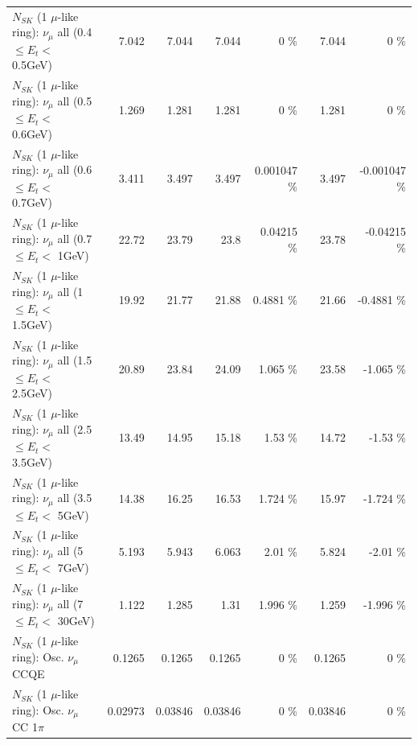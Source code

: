 \begin{table}
\begin{tabular}{| l | r | r | r  r | r  r |}
       $N_{SK}$ (1 $\mu$-like ring): $\nu_{\mu}$ all (0.4 $\leq E_{t} <$ 0.5GeV) &           7.042 &           7.044 &           7.044 &        0 \%  &           7.044 &        0 \%  \\ 
       $N_{SK}$ (1 $\mu$-like ring): $\nu_{\mu}$ all (0.5 $\leq E_{t} <$ 0.6GeV) &           1.269 &           1.281 &           1.281 &        0 \%  &           1.281 &        0 \%  \\ 
       $N_{SK}$ (1 $\mu$-like ring): $\nu_{\mu}$ all (0.6 $\leq E_{t} <$ 0.7GeV) &           3.411 &           3.497 &           3.497 & 0.001047 \%  &           3.497 & -0.001047 \%  \\ 
         $N_{SK}$ (1 $\mu$-like ring): $\nu_{\mu}$ all (0.7 $\leq E_{t} <$ 1GeV) &           22.72 &           23.79 &            23.8 &  0.04215 \%  &           23.78 & -0.04215 \%  \\ 
         $N_{SK}$ (1 $\mu$-like ring): $\nu_{\mu}$ all (1 $\leq E_{t} <$ 1.5GeV) &           19.92 &           21.77 &           21.88 &   0.4881 \%  &           21.66 &  -0.4881 \%  \\ 
       $N_{SK}$ (1 $\mu$-like ring): $\nu_{\mu}$ all (1.5 $\leq E_{t} <$ 2.5GeV) &           20.89 &           23.84 &           24.09 &    1.065 \%  &           23.58 &   -1.065 \%  \\ 
       $N_{SK}$ (1 $\mu$-like ring): $\nu_{\mu}$ all (2.5 $\leq E_{t} <$ 3.5GeV) &           13.49 &           14.95 &           15.18 &     1.53 \%  &           14.72 &    -1.53 \%  \\ 
         $N_{SK}$ (1 $\mu$-like ring): $\nu_{\mu}$ all (3.5 $\leq E_{t} <$ 5GeV) &           14.38 &           16.25 &           16.53 &    1.724 \%  &           15.97 &   -1.724 \%  \\ 
           $N_{SK}$ (1 $\mu$-like ring): $\nu_{\mu}$ all (5 $\leq E_{t} <$ 7GeV) &           5.193 &           5.943 &           6.063 &     2.01 \%  &           5.824 &    -2.01 \%  \\ 
          $N_{SK}$ (1 $\mu$-like ring): $\nu_{\mu}$ all (7 $\leq E_{t} <$ 30GeV) &           1.122 &           1.285 &            1.31 &    1.996 \%  &           1.259 &   -1.996 \%  \\ 
\hline
\hline
                               $N_{SK}$ (1 $\mu$-like ring): Osc. $\nu_\mu$ CCQE &          0.1265 &          0.1265 &          0.1265 &        0 \%  &          0.1265 &        0 \%  \\ 
                          $N_{SK}$ (1 $\mu$-like ring): Osc. $\nu_\mu$ CC 1$\pi$ &         0.02973 &         0.03846 &         0.03846 &        0 \%  &         0.03846 &        0 \%  \\ 

\end{tabular}
\end{table}
